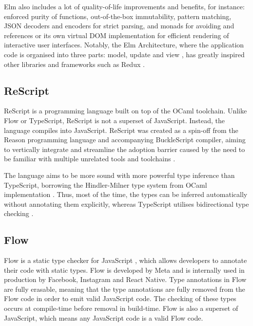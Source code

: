 Elm also includes a lot of quality-of-life improvements and benefits, for instance: enforced purity of functions, out-of-the-box immutability,  pattern matching, JSON decoders and encoders for strict parsing,  and  monads for avoiding  and  references or its own virtual DOM implementation for efficient rendering of interactive user interfaces. Notably, the Elm Architecture, where the application code is organised into three parts: model, update and view \cite{ElmArchitectureIntroduction}, has greatly inspired other libraries and frameworks such as Redux \cite{PriorArtRedux2022}.

\subsection{ReScript}

ReScript is a programming language built on top of the OCaml toolchain. Unlike Flow or TypeScript, ReScript is not a superset of JavaScript. Instead, the language compiles into JavaScript. ReScript was created as a spin-off from the Reason programming language and accompanying BuckleScript compiler, aiming to vertically integrate and streamline the adoption barrier caused by the need to be familiar with multiple unrelated tools and toolchains \cite{BuckleScriptReasonRebranding}.

The language aims to be more sound with more powerful type inference than TypeScript, borrowing the Hindler-Milner type system from OCaml implementation \cite{EfficientInsightfulGeneralization, HistoryReScript2022}. Thus, most of the time, the types can be inferred automatically without annotating them explicitly, whereas TypeScript utilises bidirectional type checking \cite{ReconstructingTypeScriptPart}.

\subsection{Flow}

Flow is a static type checker for JavaScript \cite{chaudhuriFastPreciseType2017, Flow2023}, which allows developers to annotate their code with static types. Flow is developed by Meta and is internally used in production by Facebook, Instagram and React Native. Type annotations in Flow are fully erasable, meaning that the type annotations are fully removed from the Flow code in order to emit valid JavaScript code. The checking of these types occurs at compile-time before removal in build-time. Flow is also a superset of JavaScript, which means any JavaScript code is a valid Flow code.

